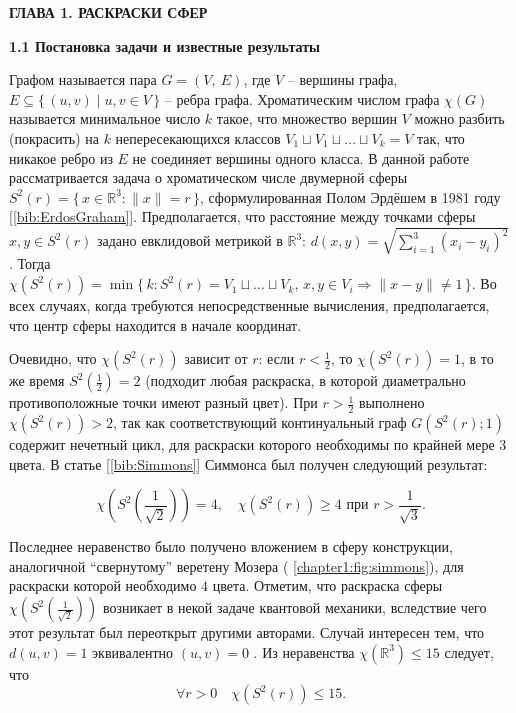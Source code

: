 \newpage
\begin{center}
\noindent\textbf{ГЛАВА 1. РАСКРАСКИ СФЕР}\label{chapters:1}
\vspace{1.5mm}
\end{center}

\vspace{5pt}
\textbf{1.1 Постановка задачи и известные результаты}\label{chapters:1.1}
\vspace{5pt}

Графом называется пара $G=(V,~E)$, где $V$ -- вершины графа, $E \subseteq \{\, (u,v) \mid u,v \in V \,\}$ -- ребра графа. 
Хроматическим числом графа $\chi(G)$ называется минимальное число $k$ такое, что множество вершин $V$ можно разбить (покрасить) на $k$ 
непересекающихся классов $V_1 \sqcup V_1 \sqcup \dots \sqcup V_k = V$ так, что никакое ребро из $E$ не соединяет вершины одного класса. 
В данной работе рассматривается задача о хроматическом числе двумерной сферы 
$S^2(r) = \{\, x \in \mathbb{R}^3 : \|x\| = r \,\}$, сформулированная Полом Эрдёшем в 1981 году [\ref{bib:ErdosGraham}].
Предполагается, что расстояние между точками сферы $x,y \in S^2(r)$ задано евклидовой метрикой в $\mathbb{R}^3$: 
$d(x,y) = \sqrt{\sum_{i=1}^{3}(x_i-y_i)^2}$. Тогда 
$\chi(S^2(r)) = \min \{\, k: S^2(r) = V_1 \sqcup \dots \sqcup V_k , \, x,y \in V_i \Rightarrow \|x - y\| \ne 1 \,\}$. 
Во всех случаях, когда требуются непосредственные вычисления, предполагается, что центр сферы находится в начале координат.

Очевидно, что $\chi(S^2(r))$ зависит от $r$: если $r < \tfrac{1}{2}$, то $\chi(S^2(r))=1$, в то же время 
$S^2\left(\tfrac{1}{2}\right) = 2$ (подходит любая раскраска, в которой диаметрально противоположные точки имеют разный цвет).
При $r > \tfrac{1}{2}$ выполнено $\chi(S^2(r))>2$, так как соответствующий континуальный граф $G(S^2(r); 1)$ содержит нечетный цикл, для раскраски которого необходимы по крайней мере $3$ цвета.
В статье [\ref{bib:Simmons}] Симмонса был получен следующий результат:

\begin{theorem1}[Симмонс, 1976]
$$ \chi\left(S^2\left(\frac{1}{\sqrt{2}}\right)\right)=4, \quad \chi(S^2(r)) \geq 4 \text{ при } r > \frac{1}{\sqrt{3}}. $$
\end{theorem1}

Последнее неравенство было получено вложением в сферу конструкции, аналогичной \enquote{свернутому} веретену Мозера (\figurename{ \ref{chapter1:fig:simmons}}), для раскраски которой необходимо $4$ цвета. 
Отметим, что раскраска сферы $\chi\left(S^2\left(\frac{1}{\sqrt{2}}\right)\right)$ возникает в некой задаче квантовой механики, вследствие чего этот результат был переоткрыт другими авторами. Случай интересен тем, что $d(u,v)=1$ эквивалентно $(u,v)=0$ .
Из неравенства $\chi(\mathbb{R}^3) \leq 15$ следует, что 
$$\forall r>0 \quad \chi(S^2(r)) \leq 15.$$

